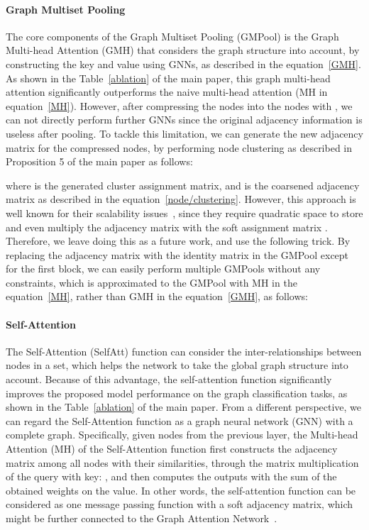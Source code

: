 \paragraph{Graph Multiset Pooling} The core components of the Graph Multiset Pooling (GMPool) is the Graph Multi-head Attention (GMH) that considers the graph structure into account, by constructing the key  and value  using GNNs, as described in the equation~\ref{GMH}. As shown in the Table~\ref{ablation} of the main paper, this graph multi-head attention significantly outperforms the naive multi-head attention (MH in equation~\ref{MH}). However, after compressing the  nodes into the  nodes with , we can not directly perform further GNNs since the original adjacency information is useless after pooling. To tackle this limitation, we can generate the new adjacency matrix  for the compressed nodes, by performing node clustering as described in Proposition 5 of the main paper as follows:

where  is the generated cluster assignment matrix, and  is the coarsened adjacency matrix as described in the equation~\ref{node/clustering}. However, this approach is well known for their scalability issues~\citep{SAGPool, GNN/sparse/pooling:Readout}, since they require quadratic space  to store and even multiply the adjacency matrix  with the soft assignment matrix . Therefore, we leave doing this as a future work, and use the following trick. By replacing the adjacency matrix  with the identity matrix  in the GMPool except for the first block, we can easily perform multiple GMPools without any constraints, which is approximated to the GMPool with MH in the equation~\ref{MH}, rather than GMH in the equation~\ref{GMH}, as follows:


\paragraph{Self-Attention}
The Self-Attention (SelfAtt) function can consider the inter-relationships between nodes in a set, which helps the network to take the global graph structure into account. Because of this advantage, the self-attention function significantly improves the proposed model performance on the graph classification tasks, as shown in the Table~\ref{ablation} of the main paper. From a different perspective, we can regard the Self-Attention function as a graph neural network (GNN) with a complete graph. Specifically, given  nodes from the previous layer, the Multi-head Attention (MH) of the Self-Attention function first constructs the adjacency matrix among all nodes with their similarities, through the matrix multiplication of the query with key: , and then computes the outputs with the sum of the obtained weights on the value. In other words, the self-attention function can be considered as one message passing function with a soft adjacency matrix, which might be further connected to the Graph Attention Network~\citep{GAT}.

